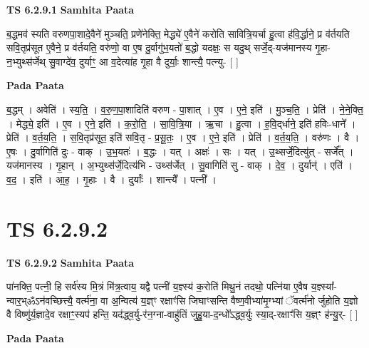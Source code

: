 \documentclass[17pt]{extarticle}
\begin{document}
\textbf{TS 6.2.9.1 } \newline
\textbf{Samhita Paata} \newline

ब॒द्धमव॑ स्यति वरुणपा॒शादे॒वैने॑ मुञ्चति॒ प्रणे॑नेक्ति॒ मेद्ध्ये॑ ए॒वैने॑ करोति सावित्रि॒यर्चा हु॒त्वा ह॑वि॒र्द्धाने॒ प्र व॑र्तयति सवि॒तृप्र॑सूत ए॒वैने॒ प्र व॑र्तयति॒ वरु॑णो॒ वा ए॒ष दु॒र्वागु॑भ॒यतो॑ ब॒द्धो यदक्षः॒ स यदु॒थ् सर्जे॒द्-यज॑मानस्य गृ॒हा-न॒भ्युथ्स॑र्जेथ् सु॒वाग्दे॑व॒ दुर्याꣳ॒॒ आ व॒देत्या॑ह गृ॒हा वै दुर्याः॒ शान्त्यै॒ पत्न्यु- [  ] \newline

\textbf{Pada Paata} \newline

ब॒द्धम् । अवेति॑ । स्य॒ति॒ । व॒रु॒ण॒पा॒शादिति॑ वरुण - पा॒शात् । ए॒व । ए॒ने॒ इति॑ । मु॒ञ्च॒ति॒ । प्रेति॑ । ने॒ने॒क्ति॒ । मेद्ध्ये॒ इति॑ । ए॒व । ए॒ने॒ इति॑ । क॒रो॒ति॒ । सा॒वि॒त्रि॒या । ऋ॒चा । हु॒त्वा । ह॒वि॒द्‌र्धाने॒ इति॑ हविः-धाने᳚ । प्रेति॑ । व॒र्त॒य॒ति॒ । स॒वि॒तृप्र॑सूत॒ इति॑ सवि॒तृ - प्र॒सू॒तः॒ । ए॒व । ए॒ने॒ इति॑ । प्रेति॑ । व॒र्त॒य॒ति॒ । वरु॑णः । वै । ए॒षः । दु॒र्वागिति॑ दुः - वाक् । उ॒भ॒यतः॑ । ब॒द्धः । यत् । अक्षः॑ । सः । यत् । उ॒थ्सर्जे॒दित्यु॑त् - सर्जे᳚त् । यज॑मानस्य । गृ॒हान् । अ॒भ्युथ्स॑र्जे॒दित्य॑भि - उथ्स॑र्जेत् । सु॒वागिति॑ सु - वाक् । दे॒व॒ । दुर्यान्॑ । एति॑ । व॒द॒ । इति॑ । आ॒ह॒ । गृ॒हाः । वै । दुर्याः᳚ । शान्त्यै᳚ । पत्नी᳚ ।  \newline





\section{ TS 6.2.9.2 }

\textbf{TS 6.2.9.2 } \newline
\textbf{Samhita Paata} \newline

पा॑नक्ति॒ पत्नी॒ हि सर्व॑स्य मि॒त्रं मि॑त्र॒त्वाय॒ यद्वै पत्नी॑ य॒ज्ञ्स्य॑ क॒रोति॑ मिथु॒नं तदथो॒ पत्नि॑या ए॒वैष य॒ज्ञ्स्या᳚-न्वार॒भ्ॐऽन॑वच्छित्त्यै॒ वर्त्म॑ना॒ वा अ॒न्वित्य॑ य॒ज्ञ्ꣳ रक्षाꣳ॑सि जिघाꣳसन्ति वैष्ण॒वीभ्या॑मृ॒ग्भ्यां ॅवर्त्म॑नो र्जुहोति य॒ज्ञो वै विष्णु॑र्य॒ज्ञादे॒व रक्षाꣳ॒॒स्यप॑ हन्ति॒ यद॑द्ध्व॒र्यु-र॑न॒ग्ना-वाहु॑तिं जुहु॒या-द॒न्धो᳚ऽद्ध्व॒र्युः स्या॒द्-रक्षाꣳ॑सि य॒ज्ञ्ꣳ ह॑न्यु॒र्- [  ] \newline

\textbf{Pada Paata} \newline
\end{document}
